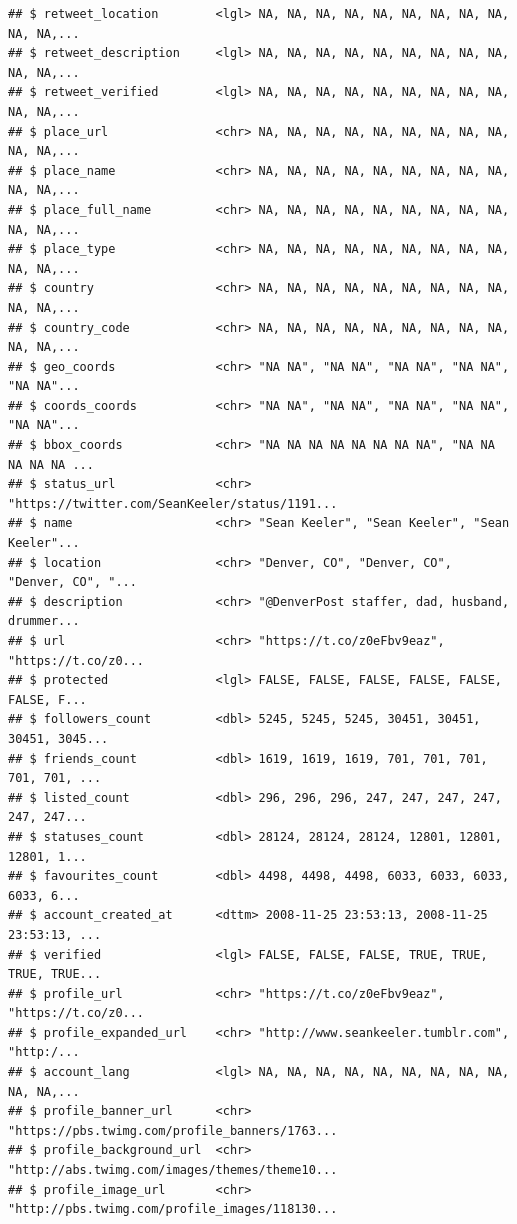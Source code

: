 \documentclass[
]{book}
\begin{document}
\begin{verbatim}
## $ retweet_location        <lgl> NA, NA, NA, NA, NA, NA, NA, NA, NA, NA, NA,...
## $ retweet_description     <lgl> NA, NA, NA, NA, NA, NA, NA, NA, NA, NA, NA,...
## $ retweet_verified        <lgl> NA, NA, NA, NA, NA, NA, NA, NA, NA, NA, NA,...
## $ place_url               <chr> NA, NA, NA, NA, NA, NA, NA, NA, NA, NA, NA,...
## $ place_name              <chr> NA, NA, NA, NA, NA, NA, NA, NA, NA, NA, NA,...
## $ place_full_name         <chr> NA, NA, NA, NA, NA, NA, NA, NA, NA, NA, NA,...
## $ place_type              <chr> NA, NA, NA, NA, NA, NA, NA, NA, NA, NA, NA,...
## $ country                 <chr> NA, NA, NA, NA, NA, NA, NA, NA, NA, NA, NA,...
## $ country_code            <chr> NA, NA, NA, NA, NA, NA, NA, NA, NA, NA, NA,...
## $ geo_coords              <chr> "NA NA", "NA NA", "NA NA", "NA NA", "NA NA"...
## $ coords_coords           <chr> "NA NA", "NA NA", "NA NA", "NA NA", "NA NA"...
## $ bbox_coords             <chr> "NA NA NA NA NA NA NA NA", "NA NA NA NA NA ...
## $ status_url              <chr> "https://twitter.com/SeanKeeler/status/1191...
## $ name                    <chr> "Sean Keeler", "Sean Keeler", "Sean Keeler"...
## $ location                <chr> "Denver, CO", "Denver, CO", "Denver, CO", "...
## $ description             <chr> "@DenverPost staffer, dad, husband, drummer...
## $ url                     <chr> "https://t.co/z0eFbv9eaz", "https://t.co/z0...
## $ protected               <lgl> FALSE, FALSE, FALSE, FALSE, FALSE, FALSE, F...
## $ followers_count         <dbl> 5245, 5245, 5245, 30451, 30451, 30451, 3045...
## $ friends_count           <dbl> 1619, 1619, 1619, 701, 701, 701, 701, 701, ...
## $ listed_count            <dbl> 296, 296, 296, 247, 247, 247, 247, 247, 247...
## $ statuses_count          <dbl> 28124, 28124, 28124, 12801, 12801, 12801, 1...
## $ favourites_count        <dbl> 4498, 4498, 4498, 6033, 6033, 6033, 6033, 6...
## $ account_created_at      <dttm> 2008-11-25 23:53:13, 2008-11-25 23:53:13, ...
## $ verified                <lgl> FALSE, FALSE, FALSE, TRUE, TRUE, TRUE, TRUE...
## $ profile_url             <chr> "https://t.co/z0eFbv9eaz", "https://t.co/z0...
## $ profile_expanded_url    <chr> "http://www.seankeeler.tumblr.com", "http:/...
## $ account_lang            <lgl> NA, NA, NA, NA, NA, NA, NA, NA, NA, NA, NA,...
## $ profile_banner_url      <chr> "https://pbs.twimg.com/profile_banners/1763...
## $ profile_background_url  <chr> "http://abs.twimg.com/images/themes/theme10...
## $ profile_image_url       <chr> "http://pbs.twimg.com/profile_images/118130...
\end{verbatim}
\end{document}
